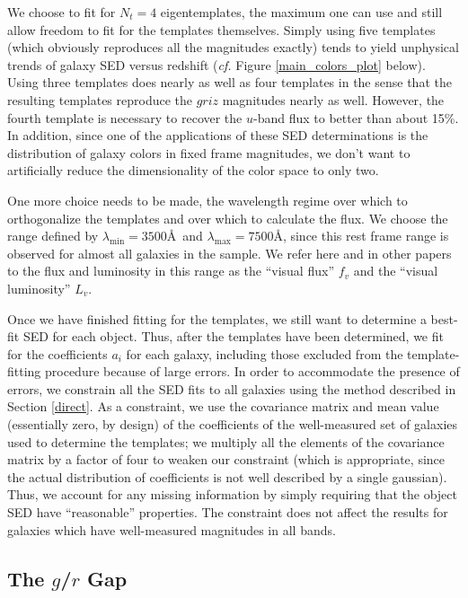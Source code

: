 \documentclass[10pt,preprint]{aastex}
\begin{document}
We choose to fit for $N_t = 4$ eigentemplates, the maximum one can use
and still allow freedom to fit for the templates themselves.  Simply
using five templates (which obviously reproduces all the magnitudes
exactly) tends to yield unphysical trends of galaxy SED versus
redshift ({\it cf.}  Figure \ref{main_colors_plot} below). Using three
templates does nearly as well as four templates in the sense that the
resulting templates reproduce the $griz$ magnitudes nearly as
well. However, the fourth template is necessary to recover the
$u$-band flux to better than about 15\%. In addition, since one of the
applications of these SED determinations is the distribution of galaxy
colors in fixed frame magnitudes, we don't want to artificially reduce
the dimensionality of the color space to only two.

One more choice needs to be made, the wavelength regime over which to
orthogonalize the templates and over which to calculate the flux. We
choose the range defined by $\lambda_{\mathrm{min}}=3500$\AA\ and
$\lambda_{\mathrm{max}}=7500$\AA, since this rest frame range is
observed for almost all galaxies in the sample. We refer here and in
other papers to the flux and luminosity in this range as the ``visual
flux'' $f_v$ and the ``visual luminosity'' $L_v$.

Once we have finished fitting for the templates, we still want to
determine a best-fit SED for each object.  Thus, after the templates
have been determined, we fit for the coefficients $a_i$ for each
galaxy, including those excluded from the template-fitting procedure
because of large errors. In order to accommodate the presence of
errors, we constrain all the SED fits to all galaxies using the method
described in Section \ref{direct}. As a constraint, we use the
covariance matrix and mean value (essentially zero, by design) of the
coefficients of the well-measured set of galaxies used to determine
the templates; we multiply all the elements of the covariance matrix
by a factor of four to weaken our constraint (which is appropriate,
since the actual distribution of coefficients is not well described by
a single gaussian).  Thus, we account for any missing information by
simply requiring that the object SED have ``reasonable''
properties. The constraint does not affect the results for galaxies
which have well-measured magnitudes in all bands.

\subsection{The $g$/$r$ Gap}
\label{grgap}
\end{document}
